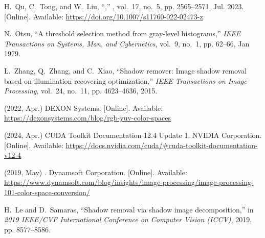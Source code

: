 \documentclass[conference]{IEEEtran}
\begin{document}
\begin{thebibliography}{10}
      \BIBentryALTinterwordspacing
      H.~Qu, C.~Tong, and W.~Liu, ``,''
      \emph{}, vol.~17,
      no.~5, pp. 2565--2571, Jul. 2023. [Online]. Available:
      \url{https://doi.org/10.1007/s11760-022-02473-z}
      \BIBentrySTDinterwordspacing

      N.~Otsu, ``A threshold selection method from gray-level histograms,''
      \emph{IEEE Transactions on Systems, Man, and Cybernetics}, vol.~9, no.~1, pp.
      62--66, Jan 1979.

      L.~Zhang, Q.~Zhang, and C.~Xiao, ``Shadow remover: Image shadow removal based
      on illumination recovering optimization,'' \emph{IEEE Transactions on Image
         Processing}, vol.~24, no.~11, pp. 4623--4636, 2015.

      \BIBentryALTinterwordspacing
      (2022, Apr.) 
      DEXON Systems. [Online]. Available:
      \url{https://dexonsystems.com/blog/rgb-yuv-color-spaces}
      \BIBentrySTDinterwordspacing

      \BIBentryALTinterwordspacing
      (2024, Apr.) {CUDA Toolkit Documentation 12.4 Update 1}. NVIDIA Corporation.
      [Online]. Available:
      \url{https://docs.nvidia.com/cuda/#cuda-toolkit-documentation-v12-4}
      \BIBentrySTDinterwordspacing

      \BIBentryALTinterwordspacing
      (2019, May) . Dynamsoft Corporation. [Online]. Available:
      \url{https://www.dynamsoft.com/blog/insights/image-processing/image-processing-101-color-space-conversion/}
      \BIBentrySTDinterwordspacing

      H.~Le and D.~Samaras, ``Shadow removal via shadow image decomposition,'' in
      \emph{2019 IEEE/CVF International Conference on Computer Vision (ICCV)},
      2019, pp. 8577--8586.

   \end{thebibliography}
\end{document}
